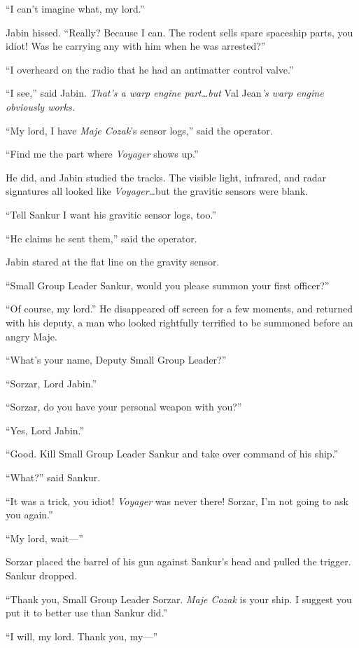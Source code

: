 \documentclass[twoside,letterpaper,12pt]{memoir}
\begin{document}
``I can't imagine what, my lord.''

Jabin hissed. ``Really? Because I can. The rodent sells spare spaceship parts, you idiot! Was he carrying any with him when he was arrested?''

``I overheard on the radio that he had an antimatter control valve.''

``I see,'' said Jabin. \textit{That's a warp engine part\ldots but }Val Jean\textit{'s warp engine obviously works.}

``My lord, I have \textit{Maje Cozak}'s sensor logs,'' said the operator.

``Find me the part where \textit{Voyager} shows up.''

He did, and Jabin studied the tracks. The visible light, infrared, and radar signatures all looked like \textit{Voyager}\ldots but the gravitic sensors were blank.

``Tell Sankur I want his gravitic sensor logs, too.''

``He claims he sent them,'' said the operator.

Jabin stared at the flat line on the gravity sensor.

``Small Group Leader Sankur, would you please summon your first officer?''

``Of course, my lord.'' He disappeared off screen for a few moments, and returned with his deputy, a man who looked rightfully terrified to be summoned before an angry Maje.

``What's your name, Deputy Small Group Leader?''

``Sorzar, Lord Jabin.''

``Sorzar, do you have your personal weapon with you?''

``Yes, Lord Jabin.''

``Good. Kill Small Group Leader Sankur and take over command of his ship.''

``What?'' said Sankur.

``It was a trick, you idiot! \textit{Voyager} was never there! Sorzar, I'm not going to ask you again.''

``My lord, wait---''

Sorzar placed the barrel of his gun against Sankur's head and pulled the trigger. Sankur dropped.

``Thank you, Small Group Leader Sorzar. \textit{Maje Cozak} is your ship. I suggest you put it to better use than Sankur did.''

``I will, my lord. Thank you, my---''
\end{document}
